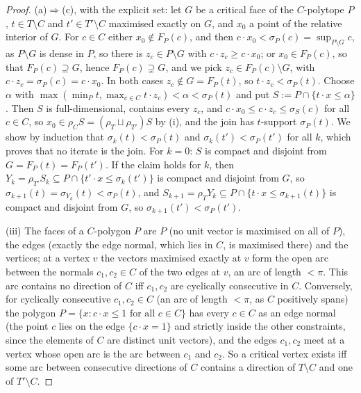 \documentclass[11pt]{amsart}
\theoremstyle{definition}
\begin{document}
\begin{proof}
(a)$\Rightarrow$(c), with the explicit set: let $G$ be a critical face
of the $C$-polytope $P$, $t\in T\setminus C$ and $t'\in T'\setminus C$
maximised exactly on $G$, and $x_0$ a point of the relative interior of
$G$. For $c\in C$ either $x_0\notin F_P(c)$, and then $c\cdot x_0<
\sigma_P(c)=\sup_{P\setminus G}c$, as $P\setminus G$ is dense in $P$,
so there is $z_c\in P\setminus G$ with $c\cdot z_c\ge c\cdot x_0$; or
$x_0\in F_P(c)$, so that $F_P(c)\supseteq G$, hence $F_P(c)\supsetneq
G$, and we pick $z_c\in F_P(c)\setminus G$, with $c\cdot z_c=\sigma_P(c)
=c\cdot x_0$. In both cases $z_c\notin G=F_P(t)$, so $t\cdot z_c<
\sigma_P(t)$. Choose $\alpha$ with $\max(\min_Pt,\max_{c\in C}t\cdot
z_c)<\alpha<\sigma_P(t)$ and put $S:=P\cap\{t\cdot x\le\alpha\}$. Then
$S$ is full-dimensional, contains every $z_c$, and $c\cdot x_0\le c
\cdot z_c\le\sigma_S(c)$ for all $c\in C$, so $x_0\in\rho_CS=(\rho_T\sqcup\rho_{T'})S$ by (i), and the join has
$t$-support $\sigma_P(t)$. We show by induction that $\sigma_k(t)<
\sigma_P(t)$ and $\sigma_k(t')<\sigma_P(t')$ for all $k$, which proves
that no iterate is the join. For $k=0$: $S$ is compact and disjoint from
$G=F_P(t)=F_P(t')$. If the claim holds for $k$, then $Y_k=\rho_{T'}S_k
\subseteq P\cap\{t'\cdot x\le\sigma_k(t')\}$ is compact and disjoint
from $G$, so $\sigma_{k+1}(t)=\sigma_{Y_k}(t)<\sigma_P(t)$, and $S_{k+1}=
\rho_TY_k\subseteq P\cap\{t\cdot x\le\sigma_{k+1}(t)\}$ is compact and
disjoint from $G$, so $\sigma_{k+1}(t')<\sigma_P(t')$.

(iii) The faces of a $C$-polygon $P$ are $P$ (no unit vector is
maximised on all of $P$), the edges (exactly the edge normal, which lies
in $C$, is maximised there) and the vertices; at a vertex $v$ the
vectors maximised exactly at $v$ form the open arc between the normals
$c_1,c_2\in C$ of the two edges at $v$, an arc of length $<\pi$. This
arc contains no direction of $C$ iff $c_1,c_2$ are cyclically
consecutive in $C$. Conversely, for cyclically consecutive $c_1,c_2\in
C$ (an arc of length $<\pi$, as $C$ positively spans) the polygon
$P=\{x:c\cdot x\le1\text{ for all }c\in C\}$ has every $c\in C$ as an
edge normal (the point $c$ lies on the edge $\{c\cdot x=1\}$ and
strictly inside the other constraints, since the elements of $C$ are
distinct unit vectors), and the edges $c_1,c_2$ meet at a vertex whose
open arc is the arc between $c_1$ and $c_2$. So a critical vertex exists
iff some arc between consecutive directions of $C$ contains a direction
of $T\setminus C$ and one of $T'\setminus C$.
\end{proof}
\end{document}
